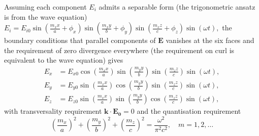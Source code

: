 \documentclass{article}
\begin{document}
Assuming each component $E_i$ admits a separable form (the trigonometric ansatz is from the wave equation)
\(
    E_i = E_{i0} \sin \left( \frac{m_{x} x}{a} + \phi_x \right) 
    \sin \left( \frac{m_{x} y}{b} + \phi_y \right)
    \sin \left( \frac{m_{x} z}{c} + \phi_z \right)
    \sin \left( \omega t \right),
\) 
the boundary conditions that parallel components of $\mathbf{E}$ vanishes at the six faces and the requirement of zero divergence everywhere (the requirement on curl is equivalent to the wave equation) gives
\begin{align*}
    E_x &= E_{x0} \cos \left( \frac{m_{x} x}{a} \right) \sin \left( \frac{m_{y} y}{b} \right) \sin \left( \frac{m_{z} z}{c} \right) \sin \left( \omega t \right), \\ 
    E_y &= E_{y0} \sin \left( \frac{m_{x} x}{a} \right) \cos \left( \frac{m_{y} y}{b} \right) \sin \left( \frac{m_{z} z}{c} \right) \sin \left( \omega t \right), \\ 
    E_z &= E_{z0} \sin \left( \frac{m_{x} x}{a} \right) \sin \left( \frac{m_{y} y}{b} \right) \cos \left( \frac{m_{z} z}{c} \right) \sin \left( \omega t \right),
\end{align*}
with transversality requirement $\mathbf{k} \cdot \mathbf{E_0} = 0$ and the quantisation requirement
\[
    \left( \frac{m_{x} }{a}\right)^{2} + 
    \left( \frac{m_{y} }{b}\right)^{2} + 
    \left( \frac{m_{z} }{c}\right)^{2} = 
    \frac{\omega ^{2} }{\pi ^{2} c^{2} }, \quad 
    m = 1, 2, \ldots
\]
\end{document}
